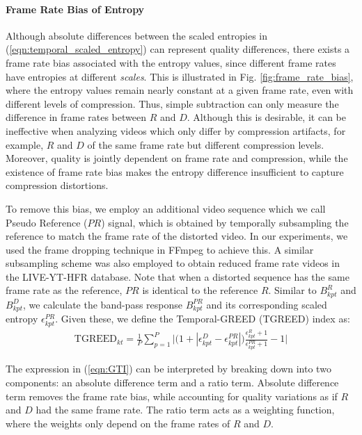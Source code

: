 \documentclass[journal]{IEEEtran}
\begin{document}
\paragraph*{\textbf{Frame Rate Bias of Entropy}} Although absolute differences between the scaled entropies in (\ref{eqn:temporal_scaled_entropy}) can represent quality differences, there exists a frame rate bias associated with the entropy values, since different frame rates have entropies at different \textit{scales}. This is illustrated in Fig. \ref{fig:frame_rate_bias}, where the entropy values remain nearly constant at a given frame rate, even with different levels of compression. Thus, simple subtraction can only measure the difference in frame rates between $R$ and $D$. Although this is desirable, it can be ineffective when analyzing videos which only differ by compression artifacts, for example, $R$ and $D$ of the same frame rate but different compression levels. Moreover, quality is jointly dependent on frame rate and compression, while the existence of frame rate bias makes the entropy difference insufficient to capture compression distortions.

To remove this bias, we employ an additional video sequence which we call Pseudo Reference ($PR$) signal, which is obtained by temporally subsampling the reference to match the frame rate of the distorted video. In our experiments, we used the frame dropping technique in FFmpeg \cite{ffmpeg} to achieve this. A similar subsampling scheme was also employed to obtain reduced frame rate videos in the LIVE-YT-HFR database. Note that when a distorted sequence has the same frame rate as the reference, $PR$ is identical to the reference $R$. Similar to $B_{kpt}^R$ and $B_{kpt}^D$, we calculate the band-pass response $B_{kpt}^{PR}$ and its corresponding scaled entropy $\epsilon_{kpt} ^{PR}$. Given these, we define the Temporal-GREED (TGREED) index as:
\begin{align}
\text{TGREED}_{kt} = \frac{1}{P}\sum_{p=1} ^P \Bigg|\Big(1 + |\epsilon_{kpt} ^D - \epsilon_{kpt} ^{PR}|\Big) \frac{\epsilon_{kpt} ^R + 1}{\epsilon_{kpt} ^{PR} + 1} - 1 \Bigg|
    \label{eqn:GTI}
\end{align}

The expression in (\ref{eqn:GTI}) can be interpreted by breaking down into two components: an absolute difference term and a ratio term. Absolute difference term removes the frame rate bias, while accounting for quality variations as if $R$ and $D$ had the same frame rate. The ratio term acts as a weighting function, where the weights only depend on the frame rates of $R$ and $D$. 
\end{document}
